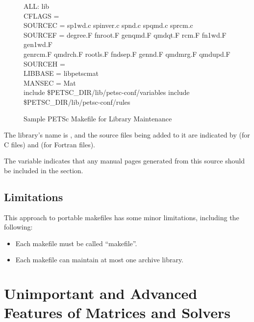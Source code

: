 {{\begin{figure}[H]
{\small
\begin{tabbing}
   ALL: lib\\

   CFLAGS   =\\
   SOURCEC  = sp1wd.c spinver.c spnd.c spqmd.c sprcm.c\\
   SOURCEF  = degree.F  fnroot.F genqmd.F qmdqt.F rcm.F fn1wd.F gen1wd.F \ \\
              genrcm.F qmdrch.F rootls.F fndsep.F gennd.F qmdmrg.F qmdupd.F\\
   SOURCEH  = \\
   LIBBASE  = libpetscmat\\
   MANSEC   = Mat\\

   include \${PETSC\_DIR}/lib/petsc-conf/variables
   include \${PETSC\_DIR}/lib/petsc-conf/rules
\end{tabbing}
}
\caption{Sample PETSc Makefile for Library Maintenance}
\label{fig_make3}
\end{figure}

The library's name is , and the source files being added
to it are indicated by  (for C files) and  (for
Fortran files).

The variable  indicates that any manual pages generated
from this source should be included in the  section.

\section{Limitations}

This approach to portable makefiles has some minor limitations, including
the following:
\begin{itemize}
\item Each makefile must be called ``makefile''.
\item Each makefile can maintain at most one archive library.
\end{itemize}



\cleardoublepage
\chapter{Unimportant and Advanced Features of Matrices and Solvers}
\label{ch_advanced}

}}
